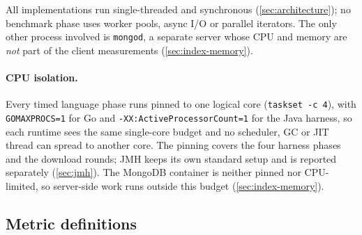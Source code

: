 All implementations run single-threaded and synchronous
(\cref{sec:architecture}); no benchmark phase uses worker pools, async I/O or
parallel iterators. The only other process involved is \texttt{mongod}, a
separate server whose CPU and memory are \emph{not} part of the client
measurements (\cref{sec:index-memory}).

\paragraph{CPU isolation.}
Every timed language phase runs pinned to one logical core
(\texttt{taskset -c 4}), with \texttt{GOMAXPROCS=1} for Go and
\texttt{-XX:ActiveProcessorCount=1} for the Java harness, so each runtime sees
the same single-core budget and no scheduler, GC or JIT thread can spread
to another core. The pinning covers the four
harness phases and the download rounds; JMH keeps its own standard setup and
is reported separately (\cref{sec:jmh}). The MongoDB container is neither
pinned nor CPU-limited, so server-side work runs outside this budget
(\cref{sec:index-memory}).

\subsection{Metric definitions}
\label{sec:metric-definitions}

